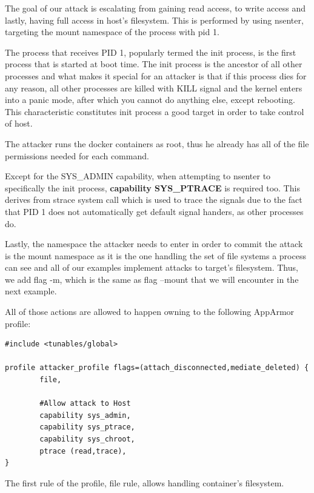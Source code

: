The goal of our attack is escalating from gaining read access, to write access and lastly, having full access in host's filesystem. This is performed by using nsenter, targeting the mount namespace of the process with pid 1.

The process that receives PID 1, popularly termed the init process, is the first process that is started at boot time. The init process is the ancestor of all other processes and what makes it special for an attacker is that if this process dies for any reason, all other processes are killed with KILL signal and the kernel enters into a panic mode, after which you cannot do anything else, except rebooting. This characteristic constitutes init process a good target in order to take control of host.

The attacker runs the docker containers as root, thus he already has all of the file permissions needed for each command.

Except for the SYS\_ADMIN capability, when attempting to nsenter to specifically the init process, \textbf{capability SYS\_PTRACE} is required too. This derives from strace system call which is used to trace the signals due to the fact that PID 1 does not automatically get default signal handers, as other processes do.

Lastly, the namespace the attacker needs to enter in order to commit the attack is the mount namespace as it is the one handling the set of file systems a process can see and all of our examples implement attacks to target's filesystem. Thus, we add flag -m, which is the same as flag --mount that we will encounter in the next example.

All of those actions are allowed to happen owning to the following AppArmor profile:

\begin{lstlisting}[style=Dockerfile, caption={AppArmor profile attacker\_profile}]
#include <tunables/global>

profile attacker_profile flags=(attach_disconnected,mediate_deleted) {
        file, 

        #Allow attack to Host
        capability sys_admin,
        capability sys_ptrace,
        capability sys_chroot,
        ptrace (read,trace),
}
\end{lstlisting}

The first rule of the profile, file rule, allows handling container's filesystem.

